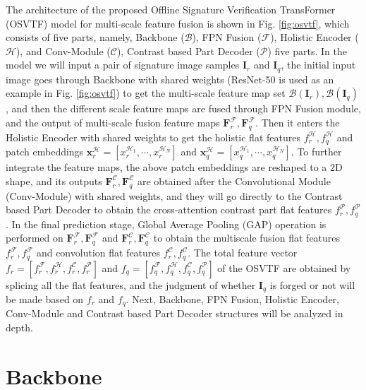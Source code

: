 The architecture of the proposed Offline Signature Verification TransFormer (OSVTF) model for multi-scale feature fusion is shown in Fig. \ref{fig:osvtf}, which consists of five parts, namely, Backbone ($\mathcal{B}$), FPN Fusion ($\mathcal{F}$), Holistic Encoder ($\mathcal{H}$), and Conv-Module ($\mathcal{C}$), Contrast based Part Decoder ($\mathcal{P}$) five parts. In the model we will input a pair of signature image samples $\mathbf{I}_r$ and $\mathbf{I}_q$, the initial input image goes through Backbone with shared weights (ResNet-50 \cite{14} is used as an example in Fig. \ref{fig:osvtf}) to get the multi-scale feature map set $\mathcal{B}(\mathbf{I}_r),\mathcal{B}(\mathbf{I}_q)$, and then the different scale feature maps are fused through FPN Fusion module, and the output of multi-scale fusion feature maps $\mathbf{F}_r^\mathcal{F},\mathbf{F}_q^\mathcal{F}$. Then it enters the Holistic Encoder with shared weights to get the holistic flat features $f_r^\mathcal{H},f_q^\mathcal{H}$ and patch embeddings $\boldsymbol{x}_r^\mathcal{H}=[x_r^{\mathcal{H}_1 }, \cdots, x_r^{\mathcal{H}_N} ]$ and $\boldsymbol{x}_q^\mathcal{H} = [ x_q^{\mathcal{H}_1}, \cdots, x_q^{\mathcal{H}_N} ]$. To further integrate the feature maps, the above patch embeddings are reshaped to a 2D shape, and its outputs $\mathbf{F}_r^\mathcal{C}, \mathbf{F}_q^\mathcal{C}$ are obtained after the Convolutional Module (Conv-Module) with shared weights, and they will go directly to the Contrast based Part Decoder to obtain the cross-attention contrast part flat features $f_r^\mathcal{P},f_q^\mathcal{P}$. In the final prediction stage, Global Average Pooling (GAP) operation is performed on $\mathbf{F}_r^\mathcal{F},\mathbf{F}_q^\mathcal{F}$ and $\mathbf{F}_r^\mathcal{C},\mathbf{F}_q^\mathcal{C}$ to obtain the multiscale fusion flat features $f_r^\mathcal{F},f_q^\mathcal{F}$ and convolution flat features $f_r^\mathcal{C},f_q^\mathcal{C}$. The total feature vector $f_r=[f_r^\mathcal{F},f_r^\mathcal{H},f_r^\mathcal{C},f_r^\mathcal{P} ]$ and $f_q=[f_q^\mathcal{F},f_q^\mathcal{H},f_q^\mathcal{C},f_q^\mathcal{P} ]$ of the OSVTF are obtained by splicing all the flat features, and the judgment of whether $\mathbf{I}_q$ is forged or not will be made based on $f_r$ and $f_q$. Next, Backbone, FPN Fusion, Holistic Encoder, Conv-Module and Contrast based Part Decoder structures will be analyzed in depth.

\section{Backbone}

